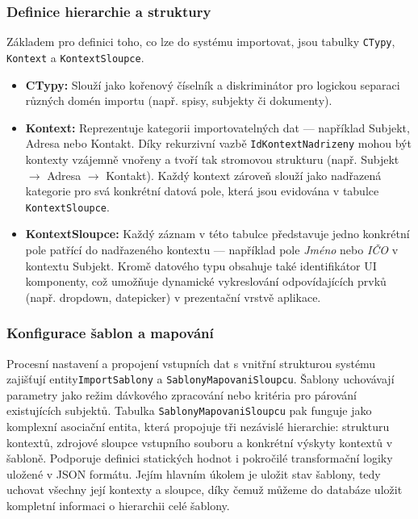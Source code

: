 \subsubsection{Definice hierarchie a struktury}
Základem pro definici toho, co lze do systému importovat, jsou tabulky \texttt{CTypy}, \texttt{Kontext} a \linebreak\texttt{KontextSloupce}.
\begin{itemize}
    \item \textbf{CTypy:} Slouží jako kořenový číselník a diskriminátor pro logickou separaci různých domén importu (např. spisy, subjekty či dokumenty).
    \item \textbf{Kontext:} Reprezentuje kategorii importovatelných dat — například Subjekt, Adresa nebo Kontakt. Díky rekurzivní vazbě \texttt{IdKontextNadrizeny} mohou být kontexty vzájemně vnořeny a tvoří tak stromovou strukturu (např. Subjekt $\rightarrow$ Adresa $\rightarrow$ Kontakt). Každý kontext zároveň slouží jako nadřazená kategorie pro svá konkrétní datová pole, která jsou evidována v tabulce \texttt{KontextSloupce}.
    \item \textbf{KontextSloupce:} Každý záznam v této tabulce představuje jedno konkrétní pole patřící do nadřazeného kontextu — například pole \textit{Jméno} nebo \textit{IČO} v kontextu Subjekt. Kromě datového typu obsahuje také identifikátor UI komponenty, což umožňuje dynamické vykreslování odpovídajících prvků (např. dropdown, datepicker) v prezentační vrstvě aplikace.
\end{itemize}

\subsubsection{Konfigurace šablon a mapování}
Procesní nastavení a propojení vstupních dat s vnitřní strukturou systému zajišťují entity\linebreak\texttt{ImportSablony} a \texttt{SablonyMapovaniSloupcu}. Šablony uchovávají parametry jako režim dávkového zpracování nebo kritéria pro párování existujících subjektů. Tabulka \texttt{SablonyMapovaniSloupcu} pak funguje jako komplexní asociační entita, která propojuje tři nezávislé hierarchie: strukturu kontextů, zdrojové sloupce vstupního souboru a konkrétní výskyty kontextů v šabloně. Podporuje definici statických hodnot i pokročilé transformační logiky uložené v JSON formátu. Jejím hlavním úkolem je uložit stav šablony, tedy uchovat všechny její kontexty a sloupce, díky čemuž můžeme do databáze uložit kompletní informaci o hierarchii celé šablony.

